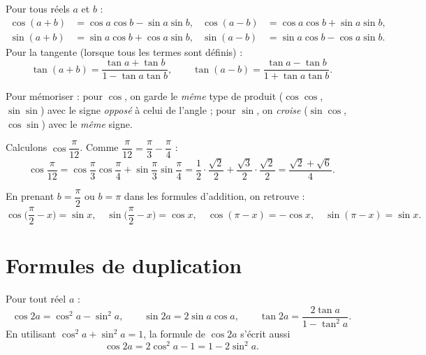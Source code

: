 \begin{theoreme}
Pour tous réels $a$ et $b$ :
\begin{align*}
  \cos(a+b) &= \cos a\cos b-\sin a\sin b, &
  \cos(a-b) &= \cos a\cos b+\sin a\sin b,\\
  \sin(a+b) &= \sin a\cos b+\cos a\sin b, &
  \sin(a-b) &= \sin a\cos b-\cos a\sin b.
\end{align*}
Pour la tangente (lorsque tous les termes sont définis) :
\[
  \tan(a+b)=\frac{\tan a+\tan b}{1-\tan a\tan b},\qquad
  \tan(a-b)=\frac{\tan a-\tan b}{1+\tan a\tan b}.
\]
\end{theoreme}

\begin{remarque}
Pour mémoriser : pour $\cos$, on garde le \emph{même} type de produit
($\cos\cos$, $\sin\sin$) avec le signe \emph{opposé} à celui de l'angle ; pour
$\sin$, on \emph{croise} ($\sin\cos$, $\cos\sin$) avec le \emph{même} signe.
\end{remarque}

\begin{exemple}
Calculons $\cos\dfrac{\pi}{12}$. Comme $\dfrac{\pi}{12}=\dfrac{\pi}{3}-\dfrac{\pi}{4}$ :
\[
  \cos\frac{\pi}{12}=\cos\frac{\pi}{3}\cos\frac{\pi}{4}+\sin\frac{\pi}{3}\sin\frac{\pi}{4}
  =\frac12\cdot\frac{\sqrt2}{2}+\frac{\sqrt3}{2}\cdot\frac{\sqrt2}{2}
  =\frac{\sqrt2+\sqrt6}{4}.
\]
\end{exemple}

\begin{propriete}
En prenant $b=\dfrac{\pi}{2}$ ou $b=\pi$ dans les formules d'addition, on retrouve :
\[
  \cos\!\Big(\frac{\pi}{2}-x\Big)=\sin x,\quad
  \sin\!\Big(\frac{\pi}{2}-x\Big)=\cos x,\quad
  \cos(\pi-x)=-\cos x,\quad
  \sin(\pi-x)=\sin x.
\]
\end{propriete}

\section{Formules de duplication}

\begin{theoreme}
Pour tout réel $a$ :
\[
  \cos 2a=\cos^2 a-\sin^2 a,\qquad
  \sin 2a=2\sin a\cos a,\qquad
  \tan 2a=\frac{2\tan a}{1-\tan^2 a}.
\]
En utilisant $\cos^2 a+\sin^2 a=1$, la formule de $\cos 2a$ s'écrit aussi
\[
  \cos 2a=2\cos^2 a-1=1-2\sin^2 a.
\]
\end{theoreme}

